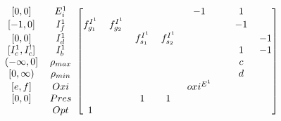 \documentclass{beamer}
\begin{document}
\begin{frame}[shrink=25]
\begin{equation*}
\begin{blockarray}{cccccccccc}
\begin{block}{cc[cccccccc]}
            {[0,0]}            & E_{i}^{1}         &                   &
                               &                   &                   &
            -1                 &                   & 1                 &
             \\
            {[-1,0]}           & I_{f}^{1}         & f_{g_{1}}^{I^{1}} &
            f_{g_{2}}^{I^{1}}  &                   &                   &
                               &                   & -1                &
             \\
            {[0,0]}            & I_{d}^{1}         &                   &
                               & f_{s_{1}}^{I^{1}} & f_{s_{2}}^{I^{1}} &
                               &                   &                   &
            -1 \\
            {[I_{c}^{1},I_{c}^{!}]}
                               & I_{b}^{1}         &                   &
                               &                   &                   &
                               &                   & 1                 &
            -1 \\ 
            {(-\infty,0]}      & \rho_{max}        &                   &
                               &                   &                   &
                               &                   & c                 &
             \\
            {[0,\infty)}       & \rho_{min}        &                   &
                               &                   &                   &
                               &                   & d                 & 
             \\
            {[e,f]}            & Oxi               &                   &
                               &                   &                   &
             oxi^{E^{1}}       &                   &                   &
             \\
            {[0,0]}            & Pres              &                   &
                               & 1                 & 1                 &
                               &                   &                   &
             \\
                               & Opt               & 1                 &
                               &                   &                   &
                               &                   &                   &
             \\
            \end{block}
        \end{blockarray}
    \end{equation*}

\end{frame}
\end{document}
